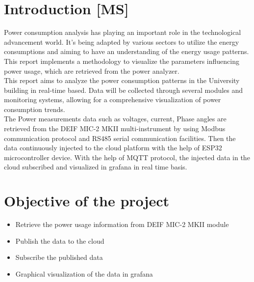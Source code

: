 \section{Introduction [MS]}
	Power consumption analysis has playing an important role in the technological advancement world.
	It’s being adapted by various sectors to utilize the energy consumptions and aiming to have an
	understanding of the energy usage patterns. This report implements a methodology to visualize the
	parameters influencing power usage, which are retrieved from the power analyzer.\\
	
	This report aims to analyze the power consumption patterns in the University building in real-time
	based. Data will be collected through several modules and monitoring systems, allowing for a
	comprehensive visualization of power consumption trends.\\
	
	The Power measurements data such as voltages, current, Phase angles are retrieved from the DEIF
	MIC-2 MKII multi-instrument by using Modbus communication protocol and RS485 serial
	communication facilities. Then the data continuously injected to the cloud platform with the help of
	ESP32 microcontroller device. With the help of MQTT protocol, the injected data in the cloud
	subscribed and visualized in grafana in real time basis.\\
	
\section{Objective of the project}
	
	\begin{itemize}
		\item Retrieve the power usage information from DEIF MIC-2 MKII module
		\item Publish the data to the cloud
		\item Subscribe the published data
		\item Graphical visualization of the data in grafana
	\end{itemize}